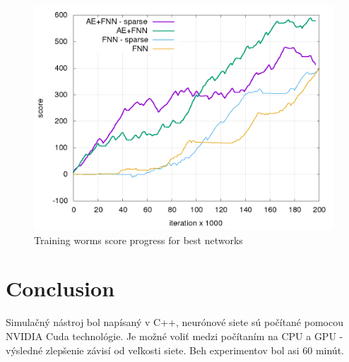 \documentclass[10pt,a4paper]{article}
\begin{document}
\begin{figure}[!h]
  \centering
  \includegraphics[scale=0.4]{../../results/rl_worms/training_progress.png}
  \caption{Training worms score progress for best networks}
  \label{img:Training worms score progress for best networks}
\end{figure}

\newpage
\section{Conclusion}

Simulačný nástroj bol napísaný v C++, neurónové siete sú počítané pomocou NVIDIA Cuda
technológie. Je možné voliť medzi počítaním na CPU a GPU - výsledné zlepšenie závisí
od veľkosti siete. Beh experimentov bol asi 60 minút.

\newpage


\end{document}
